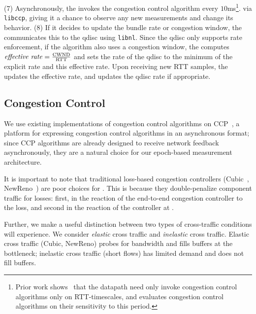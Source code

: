 (7) Asynchronously, the \inbox invokes the congestion control algorithm every $10$ms\footnote{Prior work shows~\cite{ccp} that the datapath need only invoke congestion control algorithms only on RTT-timescales, and evaluates congestion control algorithms on their sensitivity to this period.}.
via \texttt{libccp},
giving it a chance to observe any new measurements and change its behavior. (8) If it decides to update
the bundle rate or congestion window, the \inbox communicates this to the qdisc
using \texttt{libnl}. Since the qdisc only supports rate enforcement, if the algorithm
also uses a congestion window, the \inbox computes $\text{\emph{effective rate}} = \frac{\text{CWND}}{\text{RTT}}$
and sets the rate of the qdisc to the minimum of the explicit rate and this effective rate.
Upon receiving new RTT samples, the \inbox updates the effective rate, and updates the qdisc rate if appropriate.


\subsection{Congestion Control}\label{s:impl:cc}
We use existing implementations of congestion control algorithms on CCP~\cite{ccp}, a platform for expressing congestion control algorithms in an asynchronous format; since CCP algorithms are already designed to receive network feedback asynchronously, they are a natural choice for our epoch-based measurement architecture. 

It is important to note that traditional loss-based congestion controllers (\ie Cubic~\cite{cubic}, NewReno~\cite{newreno}) are poor choices for \name. 
This is because they double-penalize component traffic for losses: first, in the reaction of the end-to-end congestion controller to the loss, and second in the reaction of the controller at \name.

%
Further, we make a useful distinction between two types of cross-traffic conditions \name will experience.
We consider \emph{elastic} cross traffic and \emph{inelastic} cross traffic.
Elastic cross traffic (\eg Cubic, NewReno) probes for bandwidth and fills buffers at the bottleneck; inelastic cross traffic (\eg short flows) has limited demand and does not fill buffers.

